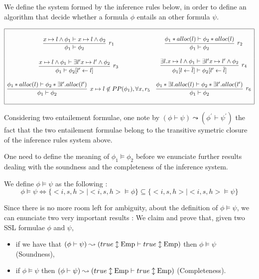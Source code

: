 \documentclass[a4paper,twoside,12pt]{report}
\newcommand{\Pp}[1]{PP(#1)} %
\newcommand{\Alloc}[1]{alloc(#1)}
\newcommand{\Emp}{\lstinline{Emp}}
\newcommand{\Unsep}[0]{\ast}
\newcommand{\Sep}[2]{#1 \Unsep #2}
\newcommand{\Pointsto}[2]{ #1 \mapsto #2}
\newcommand{\Formula}[2]{ #1  \updownarrow #2}
\newcommand{\Substin}[3]{#1\lbrack #2 \gets #3 \rbrack}
\newcommand{\true}{true}
\begin{document}
We define the system formed by the inference rules below, in order to define an algorithm that decide whether a formula $\phi$ entails an other formula $\psi$.

$$
\begin{array}{|cc|}
\hline
&\\
\infer[r_1]{ \phi_1 \vdash \phi_2}{\Pointsto{x}{l}\wedge \phi_1 \vdash \Pointsto{x}{l}\wedge \phi_2}
&
\infer[r_2]{ \phi_1 \vdash \phi_2}{\Sep{ \phi_1}{\Alloc{l}}\vdash \Sep{\phi_2}{\Alloc{l}}} \\
&\\
\infer[r_3]{ \phi_1 \vdash \Substin{\phi_2}{l^{\prime}}{l}}{\Pointsto{x}{l}\wedge \phi_1 \vdash \exists l^{\prime} \Pointsto{x}{l^{\prime}}\wedge \phi_2}
&
\infer[r_4]{ \Substin{\phi_1}{l}{\overline{l}} \vdash \Substin{\phi_2}{l^{\prime}}{\overline{l}}}{\exists l.\Pointsto{x}{l}\wedge \phi_1 \vdash \exists l^{\prime} \Pointsto{x}{l^{\prime}}\wedge \phi_2}
\\
&\\
\infer[\Pointsto{x}{l} \not\in \Pp{\phi_1}, \forall x, r_5]{ \phi_1 \vdash \phi_2}{\Sep{ \phi_1}{\Alloc{l}}\vdash \Sep{\phi_2}{\exists l^{\prime}. \Alloc{l^{\prime}}}}
&
\infer[ r_6]{ \phi_1 \vdash \phi_2}{\Sep{ \phi_1}{\exists l. \Alloc{l}}\vdash \Sep{\phi_2}{\exists l^{\prime}. \Alloc{l^{\prime}}}}
\\
&\\
\hline
\end{array}
$$

Considering two entailement formulae, one note by $(\phi \vdash \psi) \leadsto (\phi^{\prime} \vdash \psi^{\prime})$ the fact that the two entailement formulae belong to the transitive symetric closure of the inference rules system above.

One need to define the meaning of $\phi_1 \models \phi_2$ before we enunciate
further results dealing with the soundness and the completeness of the inference system.

\begin{definition}
We define $\phi \models \psi$ as the following : 
$$ \phi \models \psi \Leftrightarrow \lbrace <i,s,h> | <i,s,h>\models \phi \rbrace \subseteq \lbrace <i,s,h> | <i,s,h>\models \psi \rbrace$$
\end{definition}

Since there is no more room left for ambiguity, about the definition
of $\phi\models \psi$, we can enunciate two very important results :
We claim and prove that, given two SSL formulae $\phi$ and $\psi$,
\begin{itemize}
\item if we have that $(\phi \vdash \psi) \leadsto (\Formula{\true}{\Emp}\vdash\Formula{\true}{\Emp})$ then $\phi \models \psi$ (Soundness),  
\item if $\phi \models \psi$ then $(\phi \vdash \psi) \leadsto (\Formula{\true}{\Emp}\vdash\Formula{\true}{\Emp})$ (Completeness).
\end{itemize}
\end{document}
